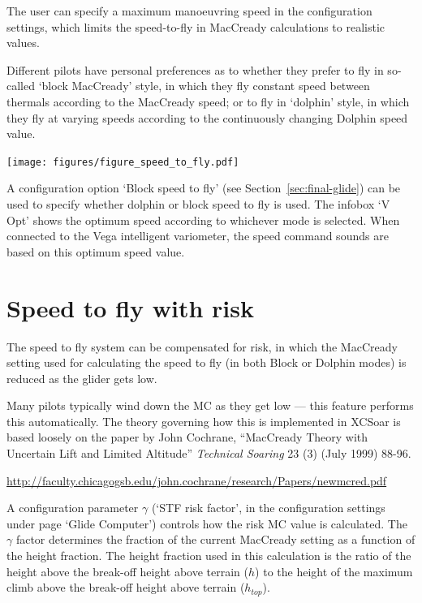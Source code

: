The user can specify a maximum manoeuvring speed in the configuration
settings, which limits the speed-to-fly in MacCready calculations to
realistic values.

Different pilots have personal preferences as to whether they prefer
to fly in so-called `block MacCready' style, in which they fly
constant speed between thermals according to the MacCready speed; or
to fly in `dolphin' style, in which they fly at varying speeds
according to the continuously changing Dolphin speed value.

\begin{maxipage}
\begin{center}
\texttt{[image: figures/figure\_speed\_to\_fly.pdf]}
\end{center}
\end{maxipage}

A configuration option `Block speed to fly' (see
Section~\ref{sec:final-glide}) can be used to specify whether dolphin
or block speed to fly is used.  The infobox `V Opt' shows the optimum
speed according to whichever mode is selected.  When connected to the
Vega intelligent variometer, the speed command sounds are based on
this optimum speed value.

\section{Speed to fly with risk}\label{sec:speed-fly-with}
  The speed to fly system can be compensated for risk, in which the
  MacCready setting used for calculating the speed to fly (in both
  Block or Dolphin modes) is reduced as the glider gets low.

  Many pilots typically wind down the MC as they get low --- this
  feature performs this automatically.  The theory governing how this
  is implemented in XCSoar is based loosely on the paper by John
  Cochrane, ``MacCready Theory with Uncertain Lift and Limited
  Altitude'' {\em Technical Soaring} 23 (3) (July 1999) 88-96.

\url{http://faculty.chicagogsb.edu/john.cochrane/research/Papers/newmcred.pdf}

  A configuration parameter $\gamma$ (`STF risk factor', in the
  configuration settings under page `Glide Computer') controls how the
  risk MC value is calculated.  The $\gamma$ factor determines the
  fraction of the current MacCready setting as a function of the
  height fraction.  The height fraction used in this calculation is
  the ratio of the height above the break-off height above terrain
  ($h$) to the height of the maximum climb above the break-off height
  above terrain ($h_{top}$).

